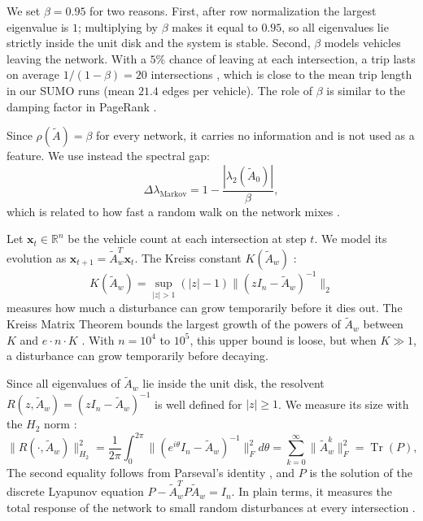 \documentclass[journal]{IEEEtran}
\begin{document}
We set $\beta = 0.95$ for two reasons. First, after row normalization the largest eigenvalue is $1$; multiplying by $\beta$ makes it equal to $0.95$, so all eigenvalues lie strictly inside the unit disk and the system is stable.
Second, $\beta$ models vehicles leaving the network. With a $5\%$ chance of leaving at each intersection, a trip lasts on average $1 / (1 - \beta) = 20$ intersections \cite{Kemeny1960}, which is close to the mean trip length in our SUMO runs (mean $21.4$ edges per vehicle). The role of $\beta$ is similar to the damping factor in PageRank \cite{Langville2006}.

Since $\rho(\tilde{A}) = \beta$ for every network, it carries no information and is not used as a feature. We use instead the spectral gap:
\begin{equation}
\Delta\lambda_{\text{Markov}} = 1 - \frac{|\lambda_2(\tilde{A}_0)|}{\beta},
\label{eq:markov_spectral_gap}
\end{equation}
which is related to how fast a random walk on the network mixes \cite{Levin2017}.

Let $\mathbf{x}_t \in \mathbb{R}^n$ be the vehicle count at each intersection at step $t$. We model its evolution as $\mathbf{x}_{t+1} = \tilde{A}_w^T \mathbf{x}_t$. The Kreiss constant $K(\tilde{A}_w)$ \cite{Kreiss1962}:
\begin{equation}
K(\tilde{A}_w) = \sup_{|z| > 1} (|z| - 1) \| (z I_n - \tilde{A}_w)^{-1} \|_2
\label{eq:kreiss}
\end{equation}
measures how much a disturbance can grow temporarily before it dies out. The Kreiss Matrix Theorem \cite{Kreiss1962} bounds the largest growth of the powers of $\tilde{A}_w$ between $K$ and $e \cdot n \cdot K$ \cite{Spijker1991}. With $n = 10^4$ to $10^5$, this upper bound is loose, but when $K \gg 1$, a disturbance can grow temporarily before decaying.

Since all eigenvalues of $\tilde{A}_w$ lie inside the unit disk, the resolvent $R(z, \tilde{A}_w) = (z I_n - \tilde{A}_w)^{-1}$ is well defined for $|z| \ge 1$. We measure its size with the $H_2$ norm \cite{Zhou1996, Bamieh2012}:
\begin{equation}
\| R(\cdot, \tilde{A}_w) \|_{H_2}^2 = \frac{1}{2\pi} \int_0^{2\pi} \|(e^{i\theta} I_n - \tilde{A}_w)^{-1}\|_F^2 d\theta = \sum_{k=0}^\infty \| \tilde{A}_w^k \|_F^2 = \operatorname{Tr}(P),
\label{eq:hardy_lyapunov}
\end{equation}
The second equality follows from Parseval's identity \cite{Zhou1996}, and $P$ is the solution of the discrete Lyapunov equation $P - \tilde{A}_w^T P \tilde{A}_w = I_n$. In plain terms, it measures the total response of the network to small random disturbances at every intersection \cite{Bamieh2012, Siami2016}.
\end{document}
